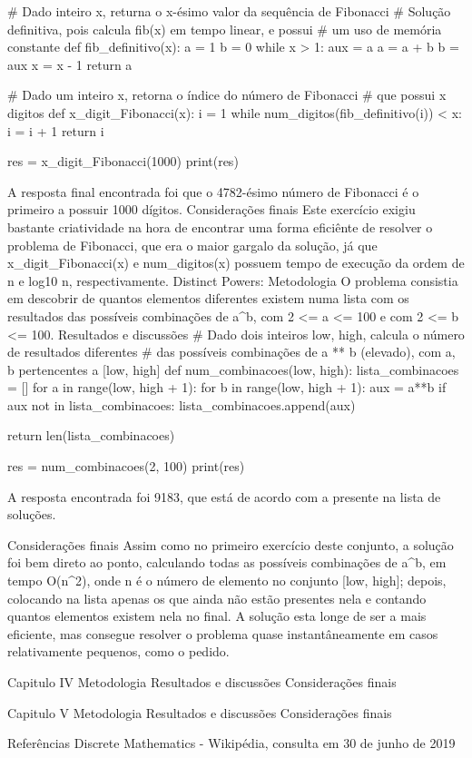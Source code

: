             # Dado inteiro x, returna o x-ésimo valor da sequência de Fibonacci
            # Solução definitiva, pois calcula fib(x) em tempo linear, e possui 
            # um uso de memória constante
            def fib_definitivo(x):
                a = 1
                b = 0
                while x > 1:
                    aux = a
                    a = a + b
                    b = aux
                    x = x - 1
                return a

            # Dado um inteiro x, retorna o índice do número de Fibonacci 
            # que possui x digitos
            def x_digit_Fibonacci(x):
                i = 1
                while num_digitos(fib_definitivo(i)) < x:
                    i = i + 1
                return i

            res = x_digit_Fibonacci(1000)
            print(res)

            A resposta final encontrada foi que o 4782-ésimo número de Fibonacci é o primeiro a possuir 1000 dígitos.
        Considerações finais
            Este exercício exigiu bastante criatividade na hora de encontrar uma forma eficiênte de resolver o problema de Fibonacci, que era o maior gargalo da solução, já que x_digit_Fibonacci(x) e num_digitos(x) possuem tempo de execução da ordem de n e log10 n, respectivamente. 
    Distinct Powers:
        Metodologia
            O problema consistia em descobrir de quantos elementos diferentes existem numa lista com os resultados das possíveis combinações de a^b, com 2 <= a <= 100 e com 2 <= b <= 100.
        Resultados e discussões
            # Dado dois inteiros low, high, calcula o número de resultados diferentes 
            # das possíveis combinações de a ** b (elevado), com a, b pertencentes a [low, high]
            def num_combinacoes(low, high):
                lista_combinacoes = []
                for a in range(low, high + 1):
                    for b in range(low, high + 1):
                        aux = a**b
                        if aux not in lista_combinacoes:
                            lista_combinacoes.append(aux)
                
                return len(lista_combinacoes)

            res = num_combinacoes(2, 100)
            print(res)

            A resposta encontrada foi 9183, que está de acordo com a presente na lista de soluções.

        Considerações finais
            Assim como no primeiro exercício deste conjunto, a solução foi bem direto ao ponto, calculando todas as possíveis combinações de a^b, em tempo O(n^2), onde n é o número de elemento no conjunto [low, high]; depois, colocando na lista apenas os que ainda não estão presentes nela e contando quantos elementos existem nela no final. A solução esta longe de ser a mais eficiente, mas consegue resolver o problema quase instantâneamente em casos relativamente pequenos, como o pedido.

Capitulo IV
    Metodologia
    Resultados e discussões
    Considerações finais

Capitulo V
    Metodologia
    Resultados e discussões
    Considerações finais

Referências
    Discrete Mathematics - Wikipédia, consulta em 30 de junho de 2019